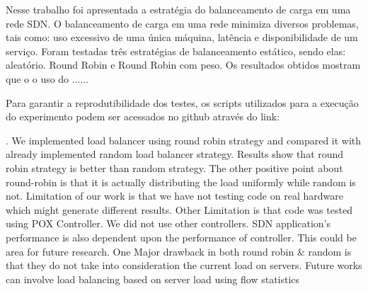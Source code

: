 \documentclass[12pt]{article}
\begin{document}
Nesse trabalho foi apresentada a estratégia do balanceamento de carga em uma rede SDN. O balanceamento de carga em uma rede minimiza diversos problemas, tais como: uso excessivo de uma única máquina, latência e disponibilidade de um serviço. Foram testadas três estratégias de balanceamento estático, sendo elas: aleatório. Round Robin e Round Robin com peso. Os resultados obtidos mostram que o o uso do ......

Para garantir a reprodutibilidade dos testes, os scripts utilizados para a execução do experimento podem ser acessados no github através do link: 

. We implemented load balancer using round robin strategy and compared it with already implemented random load balancer strategy. Results show that round robin strategy is better than random strategy. The other positive point about round-robin is that it is actually distributing the load uniformly while random is not. Limitation of our work is that we have not testing code on real hardware which might generate different results. Other Limitation is that code was tested using POX Controller. We did not use other controllers. SDN application’s performance is also dependent upon the performance of controller. This could be area for future research. One Major drawback in both round robin & random is that they do not take into consideration the current load on servers. Future works can involve load balancing based on server load using flow statistics



\end{document}
